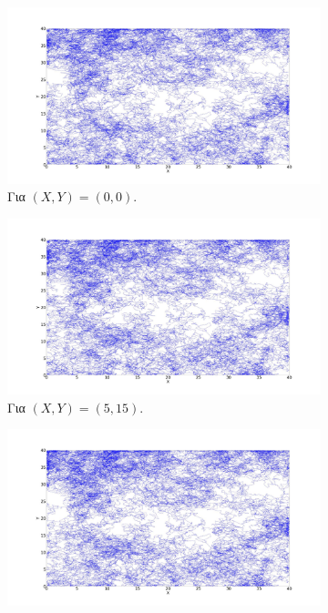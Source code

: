 \begin{figure}[ht]
	\centering
	\begin{subfigure}[b]{0.55\textwidth}
		\centering
		\includegraphics[width=\textwidth]{LateX images/log/XY1/g1-1.9}
		\caption{Για $(X,Y) = (0,0)$.}
		\label{f:g88}
	\end{subfigure}
	\hfill
	\begin{subfigure}[b]{0.55\textwidth}
		\centering
		\includegraphics[width=\textwidth]{LateX images/log/XY1/g2-1.9}
		\caption{Για $(X,Y) = (5,15)$.}
		\label{f:g89}
	\end{subfigure}
	\hfill
	\begin{subfigure}[b]{0.55\textwidth}
		\centering
		\includegraphics[width=\textwidth]{LateX images/log/XY1/g3-1.9}

\end{subfigure}
\end{figure}
